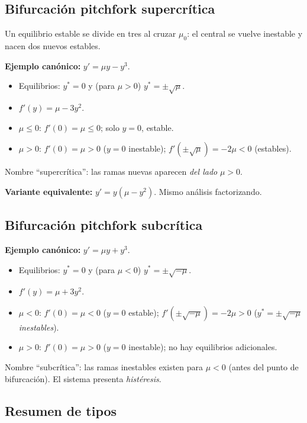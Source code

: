 \documentclass[11pt,letterpaper]{article}
\begin{document}
\subsection{Bifurcación pitchfork supercrítica}

Un equilibrio estable se divide en tres al cruzar $\mu_0$: el central se
vuelve inestable y nacen dos nuevos estables.

\textbf{Ejemplo canónico:} $y'=\mu y-y^3$.
\begin{itemize}
    \item Equilibrios: $y^*=0$ y (para $\mu>0$) $y^*=\pm\sqrt{\mu}$.
    \item $f'(y)=\mu-3y^2$.
    \item $\mu\leq 0$: $f'(0)=\mu\leq 0$; solo $y=0$, estable.
    \item $\mu>0$: $f'(0)=\mu>0$ ($y=0$ inestable); $f'(\pm\sqrt{\mu})=-2\mu<0$ (estables).
\end{itemize}
Nombre ``supercrítica'': las ramas nuevas aparecen \emph{del lado} $\mu>0$.

\textbf{Variante equivalente:} $y'=y(\mu-y^2)$. Mismo análisis factorizando.

\subsection{Bifurcación pitchfork subcrítica}

\textbf{Ejemplo canónico:} $y'=\mu y+y^3$.
\begin{itemize}
    \item Equilibrios: $y^*=0$ y (para $\mu<0$) $y^*=\pm\sqrt{-\mu}$.
    \item $f'(y)=\mu+3y^2$.
    \item $\mu<0$: $f'(0)=\mu<0$ ($y=0$ estable); $f'(\pm\sqrt{-\mu})=-2\mu>0$
          ($y^*=\pm\sqrt{-\mu}$ \emph{inestables}).
    \item $\mu>0$: $f'(0)=\mu>0$ ($y=0$ inestable); no hay equilibrios adicionales.
\end{itemize}
Nombre ``subcrítica'': las ramas inestables existen para $\mu<0$
(antes del punto de bifurcación). El sistema presenta \emph{histéresis}.

\subsection{Resumen de tipos}
\end{document}
